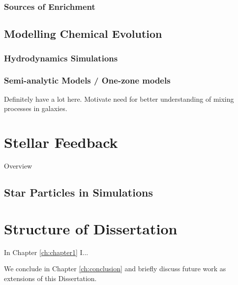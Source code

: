 \subsubsection{Sources of Enrichment}

\subsection{Modelling Chemical Evolution}

\subsubsection{Hydrodynamics Simulations}

\subsubsection{Semi-analytic Models / One-zone models}

Definitely have a lot here. Motivate need for better understanding of mixing processes in galaxies. \citep{SchonrichWeinberg2019}


\section{Stellar Feedback}\label{sec:section1}

Overview


\subsection{Star Particles in Simulations}

%
%
%


\section{Structure of Dissertation}\label{sec:structure}

In Chapter \ref{ch:chapter1} I...


We conclude in Chapter \ref{ch:conclusion} and briefly discuss future work as extensions of this Dissertation.
